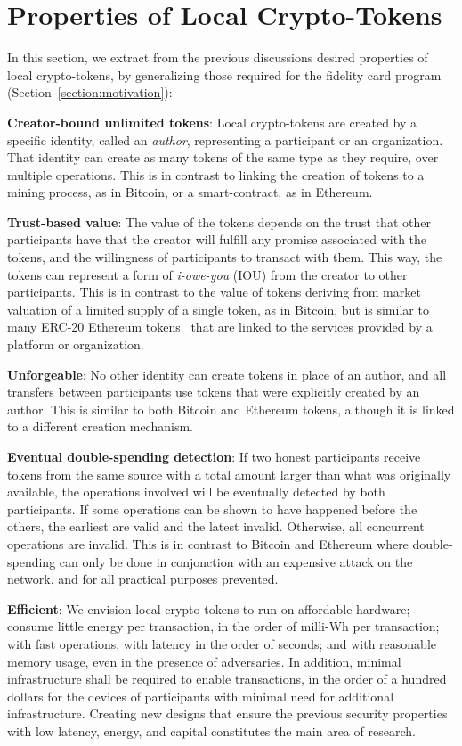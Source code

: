 \documentclass[sigplan,screen,10pt]{acmart}
\begin{document}
\section{Properties of Local Crypto-Tokens}
\label{section:problem}

In this section, we extract from the previous discussions desired properties of local crypto-tokens, by generalizing those required for the fidelity card program (Section~\ref{section:motivation}):

\textbf{Creator-bound unlimited tokens}: Local crypto-tokens are created by a specific identity, called an \textit{author}, representing a participant or an organization. That identity can create as many tokens of the same type as they require, over multiple operations. This is in contrast to linking the creation of tokens to a mining process, as in Bitcoin, or a smart-contract, as in Ethereum.

\textbf{Trust-based value}:  The value of the tokens depends on the trust that other participants have that the creator will fulfill any promise associated with the tokens, and the willingness of participants to transact with them. This way, the tokens can represent a form of \textit{i-owe-you} (IOU) from the creator to other participants. This is in contrast to the value of tokens deriving from market valuation of a limited supply of a single token, as in Bitcoin, but is similar to many ERC-20 Ethereum tokens~\cite{erc20} that are linked to the services provided by a platform or organization.

\textbf{Unforgeable}: No other identity can create tokens in place of an author, and all transfers between participants use tokens that were explicitly created by an author. This is similar to both Bitcoin and Ethereum tokens, although it is linked to a different creation mechanism.

\textbf{Eventual double-spending detection}: If two honest participants receive tokens from the same source with a total amount larger than what was originally available, the operations involved will be eventually detected by both participants. If some operations can be shown to have happened before the others, the earliest are valid and the latest invalid. Otherwise, all concurrent operations are invalid. This is in contrast to Bitcoin and Ethereum where double-spending can only be done in conjonction with an expensive attack on the network, and for all practical purposes prevented. 

\textbf{Efficient}: We envision local crypto-tokens to run on affordable hardware; consume little energy per transaction, in the order of milli-Wh per transaction; with fast operations, with latency in the order of seconds; and with reasonable memory usage, even in the presence of adversaries. 
In addition, minimal infrastructure shall be required to enable transactions, in the order of a hundred dollars for the devices of participants with minimal need for additional infrastructure. Creating new designs that ensure the previous security properties with low latency, energy, and capital constitutes the main area of research.
\end{document}

